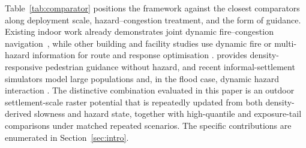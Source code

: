\documentclass[preprint,12pt]{elsarticle}
\begin{document}
Table~\ref{tab:comparator} positions the framework against the closest
comparators along deployment scale, hazard--congestion treatment, and the
form of guidance. Existing indoor work already demonstrates joint dynamic
fire--congestion navigation~\citep{Golshani2025FireNavigation}, while other
building and facility studies use dynamic fire or multi-hazard information
for route and response optimisation
\citep{Ding2024BIMFireEvac,He2024DynamicMultiHazardEvac,Luan2025ToxicGasAirport}.
\citet{Kretz2009DynamicPotential} provides density-responsive pedestrian
guidance without hazard, and recent informal-settlement simulators model
large populations and, in the flood case, dynamic hazard interaction
\citep{Butters2025Kibera,Kuligowski2025Humanitarian}. The distinctive
combination evaluated in this paper is an outdoor settlement-scale raster
potential that is repeatedly updated from both density-derived slowness and
hazard state, together with high-quantile and exposure-tail comparisons under
matched repeated scenarios. The specific contributions are enumerated in
Section~\ref{sec:intro}.
\end{document}
